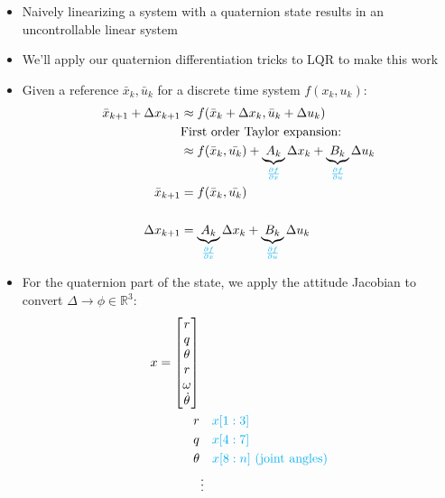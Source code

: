 \documentclass[11pt]{article}
\begin{document}
\begin{itemize}
    \item Naively linearizing a system with a quaternion state results in an uncontrollable linear system
    \item We'll apply our quaternion differentiation tricks to LQR to make this work
    \item Given a reference $\bar{x}_k, \bar{u}_k$ for a discrete time system $f(x_k,u_k):$
    \begin{align*}
        \bar{x}_{k+1} + \Delta x_{k+1} &\approx f(\bar{x}_k + \Delta x_k, \bar{u}_k + \Delta u_k)
        \\
        &\text{First order Taylor expansion:} 
        \\
        &\approx f(\bar{x}_k,\bar{u_k}) + \underbrace{A_k}_{\textcolor{cyan}{\frac{\partial f}{\partial x}}} \Delta x_k + \underbrace{B_k}_{\textcolor{cyan}{\frac{\partial f}{\partial u}}}\Delta u_k
        \\
        \bar{x}_{k+1} &= f(\bar{x}_k,\bar{u_k})\\ 
        \\
        \Delta x_{k+1} &= \underbrace{A_k}_{\textcolor{cyan}{\frac{\partial f}{\partial x}}} \Delta x_k + \underbrace{B_k}_{\textcolor{cyan}{\frac{\partial f}{\partial u}}}\Delta u_k
    \end{align*}
    \item For the quaternion part of the state, we apply the attitude Jacobian to convert $\Delta \rightarrow \phi \in \mathbb{R}^3$:
\begin{align*}
    x &= \begin{bmatrix} r \\ q \\ \theta \\ r \\ \omega \\ \dot{\theta}\end{bmatrix}
    \\
    & \hspace{10mm}r  \quad\textcolor{cyan}{x[1:3]} \\
    & \hspace{10mm}q  \quad\textcolor{cyan}{x[4:7]}\\
    & \hspace{10mm}\theta  \quad\textcolor{cyan}{x[8:n]\text{ (joint angles)}} \\
    & \hspace{12mm} \vdots
\end{align*}
\begin{align*}

\end{align*}
\end{itemize}
\end{document}

